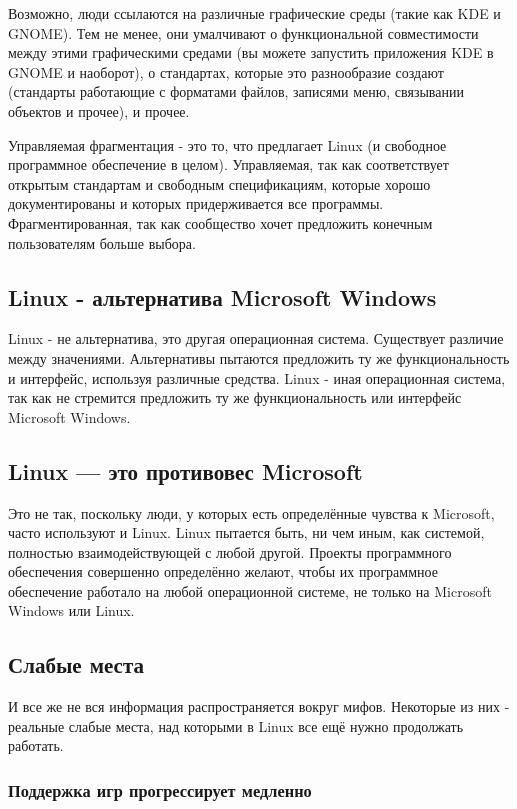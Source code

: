 \documentclass[12pt]{book}
\begin{document}
Возможно, люди ссылаются на различные графические среды (такие как KDE и GNOME). Тем не менее, они умалчивают о функциональной совместимости между этими графическими средами (вы можете запустить приложения KDE в GNOME и наоборот), о стандартах, которые это разнообразие создают (стандарты работающие с форматами файлов, записями меню, связывании объектов и прочее), и прочее.

Управляемая фрагментация - это то, что предлагает Linux (и свободное программное обеспечение в целом). Управляемая, так как соответствует открытым стандартам и свободным спецификациям, которые хорошо документированы и которых придерживается все программы. Фрагментированная, так как сообщество хочет предложить  конечным пользователям больше выбора.

\subsection{Linux - альтернатива Microsoft Windows}

Linux - не альтернатива, это другая операционная система. Существует различие между значениями. Альтернативы пытаются предложить ту же функциональность и интерфейс, используя различные средства. Linux - иная операционная система, так как не стремится предложить ту же функциональность или интерфейс Microsoft Windows.

\subsection{Linux — это противовес Microsoft}

Это не так, поскольку люди, у которых есть определённые чувства к Microsoft, часто используют и Linux. Linux пытается быть, ни чем иным, как системой, полностью взаимодействующей с любой другой. Проекты программного обеспечения совершенно определённо желают, чтобы их программное обеспечение работало на любой операционной системе, не только на Microsoft Windows или Linux.

\subsection{Слабые места}

И все же не вся информация распространяется вокруг мифов. Некоторые из них - реальные слабые места, над которыми в Linux все ещё нужно продолжать работать.

\subsubsection{Поддержка игр прогрессирует медленно}
\end{document}

